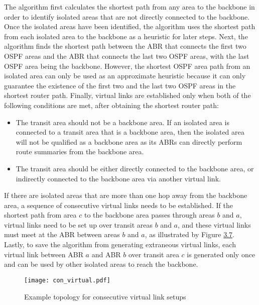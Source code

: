 \documentclass{uiucthesis2021}
\begin{document}
\noindent The algorithm first calculates the shortest path from any area to the backbone in order to identify isolated areas that are not directly connected to the backbone. Once the isolated areas have been identified, the algorithm uses the shortest path from each isolated area to the backbone as a heuristic for later steps. Next, the algorithm finds the shortest path between the ABR that connects the first two OSPF areas and the ABR that connects the last two OSPF areas, with the last OSPF area being the backbone. However, the shortest OSPF area path from an isolated area can only be used as an approximate heuristic because it can only guarantee the existence of the first two and the last two OSPF areas in the shortest router path. Finally, virtual links are established only when both of the following conditions are met, after obtaining the shortest router path:
\begin{itemize}
    \item The transit area should not be a backbone area. If an isolated area is connected to a transit area that is a backbone area, then the isolated area will not be qualified as a backbone area as its ABRs can directly perform route summaries from the backbone area. 
    \item The transit area should be either directly connected to the backbone area, or indirectly connected to the backbone area via another virtual link. 
\end{itemize}

\noindent If there are isolated areas that are more than one hop away from the backbone area, a sequence of consecutive virtual links needs to be established. If the shortest path from area $c$ to the backbone area passes through areas $b$ and $a$, virtual links need to be set up over transit areas $b$ and $a$, and these virtual links must meet at the ABR between areas $b$ and $a$, as illustrated by Figure \hyperref[f37]{3.7}. Lastly, to save the algorithm from generating extraneous virtual links, each virtual link between ABR $a$ and ABR $b$ over transit area $c$ is generated only once and can be used by other isolated areas to reach the backbone. \\

\label{f37}
\begin{figure}[H]
\texttt{[image: con\_virtual.pdf]}
\centering
\caption{Example topology for consecutive virtual link setups}
\centering
\end{figure}
\end{document}
